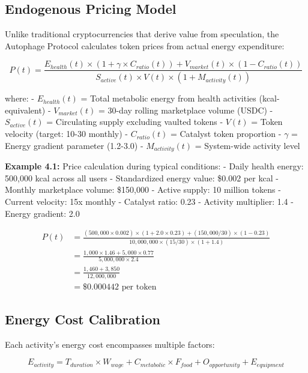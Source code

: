 \documentclass[11pt,letterpaper]{article}
\begin{document}
\subsection{Endogenous Pricing Model}

Unlike traditional cryptocurrencies that derive value from speculation, the Autophage Protocol calculates token prices from actual energy expenditure:

\begin{equation}
P(t) = \frac{E_{health}(t) \times (1 + \gamma \times C_{ratio}(t)) + V_{market}(t) \times (1 - C_{ratio}(t))}{S_{active}(t) \times V(t) \times (1 + M_{activity}(t))}
\end{equation}

where:
- $E_{health}(t)$ = Total metabolic energy from health activities (kcal-equivalent)
- $V_{market}(t)$ = 30-day rolling marketplace volume (USDC)
- $S_{active}(t)$ = Circulating supply excluding vaulted tokens
- $V(t)$ = Token velocity (target: 10-30 monthly)
- $C_{ratio}(t)$ = Catalyst token proportion
- $\gamma$ = Energy gradient parameter (1.2-3.0)
- $M_{activity}(t)$ = System-wide activity level

\textbf{Example 4.1:} Price calculation during typical conditions:
- Daily health energy: 500,000 kcal across all users
- Standardized energy value: \$0.002 per kcal
- Monthly marketplace volume: \$150,000
- Active supply: 10 million tokens
- Current velocity: 15x monthly
- Catalyst ratio: 0.23
- Activity multiplier: 1.4
- Energy gradient: 2.0

\begin{align}
P(t) &= \frac{(500,000 \times 0.002) \times (1 + 2.0 \times 0.23) + (150,000/30) \times (1 - 0.23)}{10,000,000 \times (15/30) \times (1 + 1.4)} \\
&= \frac{1,000 \times 1.46 + 5,000 \times 0.77}{5,000,000 \times 2.4} \\
&= \frac{1,460 + 3,850}{12,000,000} \\
&= \$0.000442 \text{ per token}
\end{align}

\subsection{Energy Cost Calibration}

Each activity's energy cost encompasses multiple factors:

\begin{equation}
E_{activity} = T_{duration} \times W_{wage} + C_{metabolic} \times F_{food} + O_{opportunity} + E_{equipment}
\end{equation}
\end{document}
